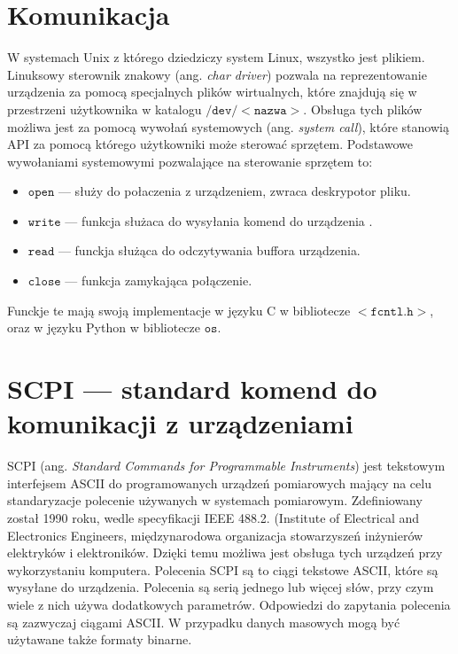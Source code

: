\documentclass[a4paper, portrait,12pt]{mwrep}
\begin{document}
\section{Komunikacja}
W systemach Unix z którego dziedziczy system Linux, wszystko jest plikiem. Linuksowy sterownik znakowy (ang. \textit{char driver}) pozwala na reprezentowanie urządzenia za pomocą specjalnych plików wirtualnych, które znajdują się w przestrzeni użytkownika w katalogu $\mathtt{/dev/<nazwa>}$. Obsługa tych plików możliwa jest za pomocą wywołań systemowych (ang. \textit{system call}), które stanowią API za pomocą którego użytkowniki może sterować sprzętem. Podstawowe wywołaniami systemowymi pozwalające na sterowanie sprzętem to:
\begin{itemize}
\item $\mathtt{open}$ --- służy do połaczenia z urządzeniem, zwraca deskrypotor pliku.
\item $\mathtt{write}$ --- funkcja służaca do wysyłania komend do urządzenia .
\item $\mathtt{read}$ --- funckja służąca do odczytywania buffora urządzenia.
\item $\mathtt{close}$ --- funkcja zamykająca połączenie.
\end{itemize}
Funckje te mają swoją implementacje w języku C w bibliotecze $<\mathtt{fcntl.h}>$, oraz w języku Python w bibliotecze $\mathtt{os}$.
\section{SCPI --- standard komend do komunikacji z urządzeniami}
SCPI  (ang. \textit{Standard  Commands  for  Programmable  Instruments}) jest tekstowym interfejsem ASCII do programowanych urządzeń pomiarowych mający na celu standaryzacje polecenie używanych w systemach pomiarowym. Zdefiniowany został 1990 roku, wedle specyfikacji IEEE 488.2. (Institute of Electrical and Electronics Engineers, międzynarodowa organizacja stowarzyszeń inżynierów elektryków i elektroników.  Dzięki temu możliwa jest obsługa tych urządzeń przy wykorzystaniu komputera. Polecenia SCPI są to ciągi tekstowe ASCII, które są wysyłane do urządzenia. Polecenia są serią jednego lub więcej słów, przy czym wiele z nich używa dodatkowych parametrów. Odpowiedzi do zapytania polecenia są zazwyczaj ciągami ASCII. W przypadku danych masowych mogą być użytawane także formaty binarne. \\
\end{document}
